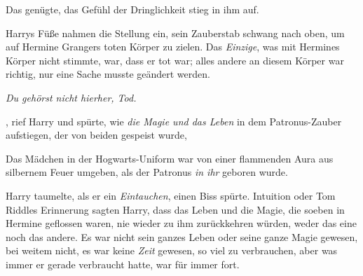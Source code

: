 Das genügte, das Gefühl der Dringlichkeit stieg in ihm auf.

Harrys Füße nahmen die Stellung ein, sein Zauberstab schwang nach oben, um auf Hermine Grangers toten Körper zu zielen. Das \emph{Einzige}, was mit Hermines Körper nicht stimmte, war, dass er tot war; alles andere an diesem Körper war richtig, nur eine Sache musste geändert werden.

\emph{Du gehörst nicht hierher, Tod.}

, rief Harry und spürte, wie \emph{die Magie und das Leben} in dem Patronus-Zauber aufstiegen, der von beiden gespeist wurde, 

Das Mädchen in der Hogwarts-Uniform war von einer flammenden Aura aus silbernem Feuer umgeben, als der Patronus \emph{in ihr} geboren wurde.

Harry taumelte, als er ein \emph{Eintauchen}, einen Biss spürte. Intuition oder Tom Riddles Erinnerung sagten Harry, dass das Leben und die Magie, die soeben in Hermine geflossen waren, nie wieder zu ihm zurückkehren würden, weder das eine noch das andere. Es war nicht sein ganzes Leben oder seine ganze Magie gewesen, bei weitem nicht, es war keine \emph{Zeit} gewesen, so viel zu verbrauchen, aber was immer er gerade verbraucht hatte, war für immer fort.

